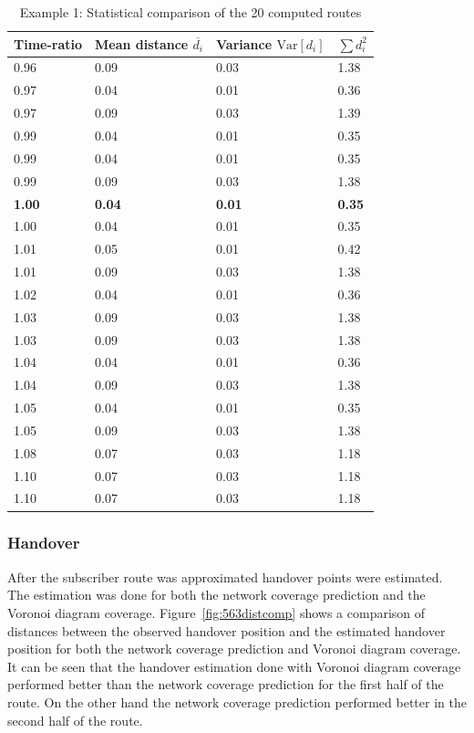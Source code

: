 \documentclass[master,english]{hgbthesis}
\begin{document}
\begin{table}
\centering
\begin{tabular}{l|l|l|l}
Time-ratio & Mean distance $\overline{d_i}$ & Variance $\mathrm{Var}[d_i]$& $\sum {d}_{i}^{2}$ \\
\hline
0.96 & 0.09 & 0.03 & 1.38 \\
0.97 & 0.04 & 0.01 & 0.36 \\
0.97 & 0.09 & 0.03 & 1.39 \\
0.99 & 0.04 & 0.01 & 0.35 \\
0.99 & 0.04 & 0.01 & 0.35 \\
0.99 & 0.09 & 0.03 & 1.38 \\
\textbf{1.00} & \textbf{0.04 }& \textbf{0.01} & \textbf{0.35} \\
1.00 & 0.04 & 0.01 & 0.35 \\
1.01 & 0.05 & 0.01 & 0.42 \\
1.01 & 0.09 & 0.03 & 1.38 \\
1.02 & 0.04 & 0.01 & 0.36 \\
1.03 & 0.09 & 0.03 & 1.38 \\
1.03 & 0.09 & 0.03 & 1.38 \\
1.04 & 0.04 & 0.01 & 0.36 \\
1.04 & 0.09 & 0.03 & 1.38 \\
1.05 & 0.04 & 0.01 & 0.35 \\
1.05 & 0.09 & 0.03 & 1.38 \\
1.08 & 0.07 & 0.03 & 1.18 \\
1.10 & 0.07 & 0.03 & 1.18 \\
1.10 & 0.07 & 0.03 & 1.18
\end{tabular}
\caption{Example 1:  Statistical comparison of the 20 computed routes}
\label{tab:563route}
\end{table}
\subsubsection{Handover}
After the subscriber route was approximated handover points were estimated. The estimation was done for both the network coverage prediction and the Voronoi diagram coverage. Figure~\ref{fig:563distcomp} shows a comparison of distances between the observed handover position and the estimated handover position for both the network coverage prediction and Voronoi diagram coverage. It can be seen that the handover estimation done with Voronoi diagram coverage performed better than the network coverage prediction for the first half of the route. On the other hand the network coverage prediction performed better in the second half of the route.
\end{document}
